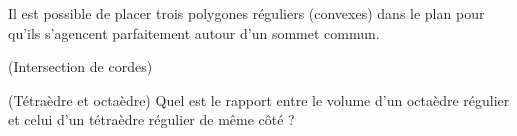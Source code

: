 \begin{exercise}
Il est possible de placer trois polygones réguliers (convexes) dans le plan pour qu'ils s'agencent parfaitement autour d'un sommet commun.
\end{exercise}

\begin{exercise}{(Intersection de cordes)}

\end{exercise}

\begin{exercise}{(Tétraèdre et octaèdre)}
Quel est le rapport entre le volume d'un octaèdre régulier et celui d'un tétraèdre régulier de même côté ?
\end{exercise}
